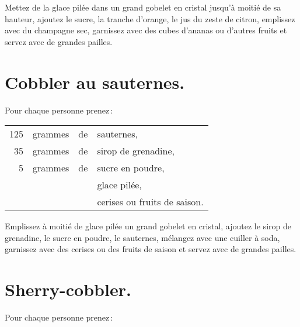 Mettez de la glace pilée dans un grand gobelet en cristal jusqu'à moitié de sa
hauteur, ajoutez le sucre, la tranche d'orange, le jus du zeste de citron,
emplissez avec du champagne sec, garnissez avec des cubes d'ananas ou d'autres
fruits et servez avec de grandes pailles.

\section*{\centering Cobbler au sauternes.}
{}

Pour chaque personne prenez :

\footnotesize
\begin{longtable}{rrrp{16em}}
    125 & grammes & de & sauternes,                                                                       \\
     35 & grammes & de & sirop de grenadine,                                                              \\
      5 & grammes & de & sucre en poudre,                                                                 \\
        &         &    & glace pilée,                                                                     \\
        &         &    & cerises ou fruits de saison.                                                     \\
\end{longtable}
\normalsize

Emplissez à moitié de glace pilée un grand gobelet en cristal, ajoutez le sirop
de grenadine, le sucre en poudre, le sauternes, mélangez avec une cuiller
à soda, garnissez avec des cerises ou des fruits de saison et servez avec de
grandes pailles.

\section*{\centering Sherry-cobbler.}
{}

Pour chaque personne prenez :

